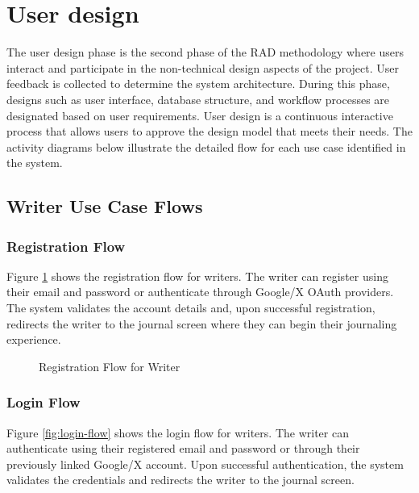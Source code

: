 \section{User design}\label{sec:userDesign}

The user design phase is the second phase of the RAD methodology where users interact and participate in the non-technical design aspects of the project. User feedback is collected to determine the system architecture. During this phase, designs such as user interface, database structure, and workflow processes are designated based on user requirements. User design is a continuous interactive process that allows users to approve the design model that meets their needs. The activity diagrams below illustrate the detailed flow for each use case identified in the system.

\subsection{Writer Use Case Flows}\label{subsec:writerFlows}

\subsubsection{Registration Flow}\label{subsubsec:registerFlow}

Figure \ref{fig:register-flow} shows the registration flow for writers. The writer can register using their email and password or authenticate through Google/X OAuth providers. The system validates the account details and, upon successful registration, redirects the writer to the journal screen where they can begin their journaling experience.

\begin{figure}[H]
\centering

\caption{Registration Flow for Writer}
\label{fig:register-flow}
\end{figure}

\subsubsection{Login Flow}\label{subsubsec:loginFlow}

Figure \ref{fig:login-flow} shows the login flow for writers. The writer can authenticate using their registered email and password or through their previously linked Google/X account. Upon successful authentication, the system validates the credentials and redirects the writer to the journal screen.

